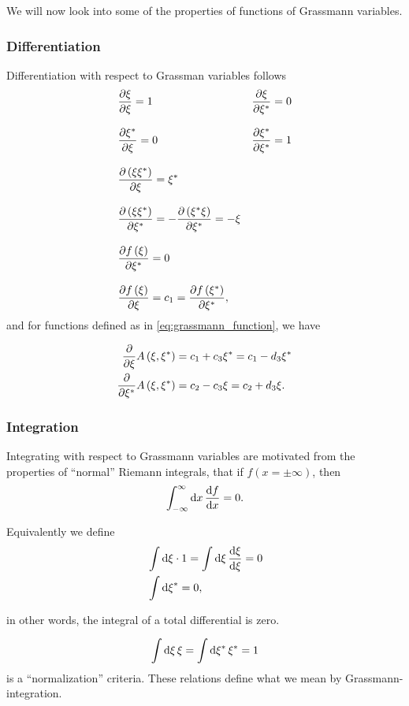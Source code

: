 We will now look into some of the properties of functions of Grassmann variables.
\subsubsection{Differentiation}

Differentiation with respect to Grassman variables follows
\begin{align}
&\frac{\partial \xi}{\partial \xi} = 1 & \frac{\partial \xi}{\partial \xi^*} = 0   \\[2ex]
&\frac{\partial \xi^*}{\partial\xi} = 0 & \frac{\partial \xi^*}{\partial \xi^*} = 1  \\[2ex]
&\pdv{\left(\xi\xi^*\right)}{\xi} = \xi^* &  \\[2ex]
&\pdv{\left(\xi\xi^*\right)}{\xi^*} = -\pdv{\left(\xi^*\xi\right)}{\xi^*} = -\xi  \\[2ex]
&\pdv{f\left(\xi\right)}{\xi^*} = 0 &\\[2ex]
&\pdv{f\left(\xi\right)}{\xi} = c_1 = \pdv{f\left(\xi^*\right)}{\xi^*}, &
\end{align}
and for functions defined as in \eqref{eq:grassmann_function}, we have

\begin{align}
\label{eq:grassmann_derivation}
\pdv{\xi}A\left(\xi, \xi^*\right) &= c_1 + c_3\xi^* = c_1 - d_3\xi^* \\
\pdv{\xi^*}A\left(\xi, \xi^*\right) &= c_2 - c_3\xi = c_2 + d_3\xi.
\end{align}

\subsubsection{Integration}
Integrating with respect to Grassmann variables are motivated from the properties of ``normal'' Riemann integrals, that if $f\left(x = \pm \infty\right)$, then
\begin{equation}
\int_{-\infty}^{\infty}\dd{x} \dv{f}{x} = 0.
\end{equation}

Equivalently we define
\begin{align}
&\int\dd{\xi}\cdot 1 =\int\dd{\xi}\dv{\xi}{\xi} = 0 \\
&\int\dd{\xi}^* = 0,
\end{align}

in other words, the integral of a total differential is zero.

\begin{equation}
\int\dd{\xi}\xi = \int\dd{\xi^*}\xi^* = 1
\end{equation}
is a ``normalization'' criteria. These relations define what we mean by Grassmann-integration.

